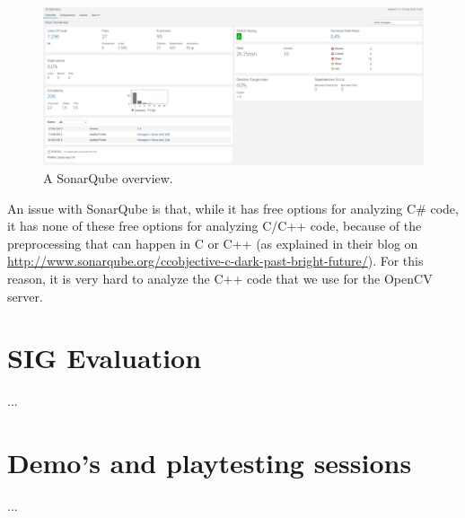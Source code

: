 		\begin{figure}[!ht]
			\centering
			\includegraphics[width=\textwidth]{SonarQube}
			\caption{A SonarQube overview.}
			\label{fig:sonarqube}
		\end{figure}
		
		An issue with SonarQube is that, while it has free options for analyzing
		C\# code, it has none of these free options for analyzing C/C++ code,
		because of the preprocessing that can happen in C or C++ (as explained
		in their blog on \url{http://www.sonarqube.org/ccobjective-c-dark-past-bright-future/}).
		For this reason, it is very hard to analyze the C++ code that we use for the
		OpenCV server.
		
	\section{SIG Evaluation} \label{sec:sigevaluation}
		...
		
	\section{Demo's and playtesting sessions} \label{sec:demos}
		...
